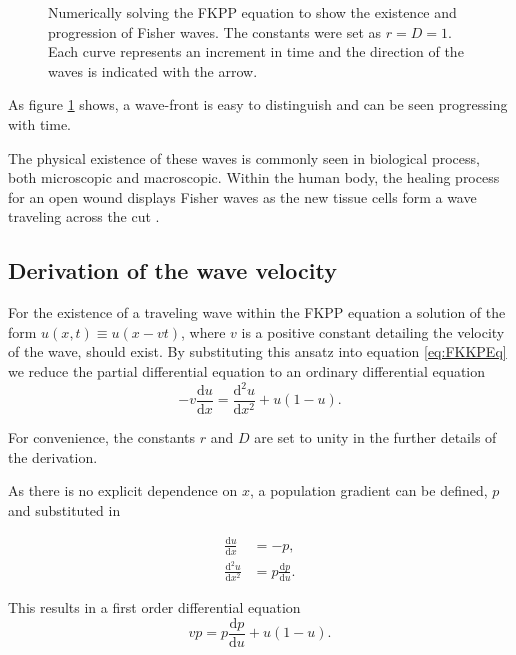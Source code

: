 \documentclass[12pt, a4paper,]{article}
\let\cite=\supercite
\begin{document}
\begin{figure}[H]
\centering

\caption{Numerically solving the FKPP equation to show the existence and progression of Fisher waves. The constants were set as $r=D=1$. Each curve represents an increment in time and the direction of the waves is indicated with the arrow.}
\label{fig:FKKPWaves}
\end{figure}

As figure \ref{fig:FKKPWaves} shows, a wave-front is easy to distinguish and can be seen progressing with time. 

The physical existence of these waves is commonly seen in biological process, both microscopic and macroscopic. Within the human body, the healing process for an open wound displays Fisher waves as the new tissue cells form a wave traveling across the cut \cite{maini_traveling_2004}.

\subsection{Derivation of the wave velocity}

For the existence of a traveling wave within the FKPP equation a solution of the form $u(x,t) \equiv u(x-vt)$, where $v$ is a positive constant detailing the velocity of the wave, should exist. By substituting this ansatz into equation \eqref{eq:FKKPEq} we reduce the partial differential equation to an ordinary differential equation 
\begin{equation}
- v \frac{\mathrm{d}u}{\mathrm{d} x} =  \frac{\mathrm{d} ^2 u }{\mathrm{d} x^2 } + u(1-u).
\label{eq:FKKPODE}
\end{equation}

For convenience, the constants $r$ and $D$ are set to unity in the further details of the derivation. 

As there is no explicit dependence on $x$, a population gradient can be defined, $p$ and substituted in

\begin{align}
\frac{\mathrm{d} u}{\mathrm{d} x} & = - p,  \\
\frac{\mathrm{d} ^2 u}{\mathrm{d}x ^2 } & =  p \frac{\mathrm{d} p }{\mathrm{d} u}.
\end{align}

This results in a first order differential equation
\begin{equation}
v p  = p \frac{\mathrm{d} p}{\mathrm{d} u} + u(1-u).
\end{equation}
\end{document}
